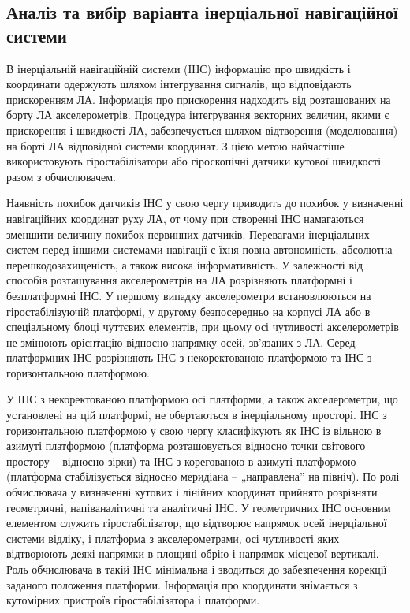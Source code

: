\subsection{Аналіз та вибір варіанта інерціальної навігаційної системи}
В інерціальній  навігаційній системи (ІНС)  інформацію про швидкість і 
координати одержують шляхом інтегрування сигналів, що відповідають прискоренням 
ЛА. Інформація про прискорення надходить від розташованих на борту ЛА 
акселерометрів. Процедура інтегрування векторних величин, якими є прискорення і 
швидкості ЛА, забезпечується шляхом відтворення (моделювання) на борті ЛА відповідної 
системи координат. З цією метою найчастіше використовують гіростабілізатори 
або гіроскопічні датчики кутової швидкості разом з обчислювачем. 

Наявність похибок датчиків ІНС у свою чергу приводить до похибок 
у визначенні навігаційних координат руху ЛА, от чому при створенні 
ІНС намагаються зменшити величину похибок первинних датчиків.
Перевагами інерціальних систем перед іншими системами навігації є їхня 
повна автономність, абсолютна перешкодозахищеність, а також висока інформативність.
У залежності від способів розташування акселерометрів на ЛА розрізняють платформні 
і безплатформні ІНС. У першому випадку акселерометри встановлюються на 
гіростабілізуючій платформі, у другому безпосередньо на корпусі ЛА або в 
спеціальному блоці чуттєвих елементів, при цьому осі чутливості акселерометрів 
не змінюють орієнтацію відносно напрямку осей, зв'язаних з ЛА.
Серед платформних ІНС розрізняють ІНС з некоректованою платформою та 
ІНС з горизонтальною платформою. 

У ІНС з некоректованою платформою осі платформи, а також акселерометри, що установлені на 
цій платформі, не обертаються в інерціальному просторі. 
ІНС з горизонтальною платформою у свою чергу класифікують як ІНС із вільною в 
азимуті платформою (платформа розташовується відносно точки світового простору – відносно зірки) 
та ІНС з корегованою в азимуті платформою (платформа стабілізується відносно меридіана – „направлена” на північ).
По ролі обчислювача у визначенні кутових і лінійних координат прийнято 
розрізняти геометричні, напіваналітичні та аналітичні ІНС. У геометричних ІНС 
основним елементом служить гіростабілізатор, що відтворює напрямок осей інерціальної 
системи відліку, і платформа з акселерометрами, осі чутливості яких відтворюють деякі 
напрямки в площині обрію і напрямок місцевої вертикалі. Роль обчислювача в такій ІНС 
мінімальна і зводиться до забезпечення корекції заданого положення платформи. Інформація 
про координати знімається з кутомірних пристроїв гіростабілізатора і платформи.

